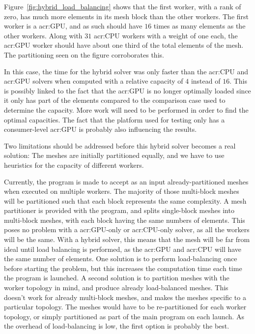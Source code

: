 Figure~\ref{fig:hybrid_load_balancing} shows that the first worker, with a rank of zero, has much
more elements in its mesh block than the other workers. The first worker is a \acrshort{acr:GPU},
and as such should have \(16\) times as many elements as the other workers. Along with \(31\)
\acrshort{acr:CPU} workers with a weight of one each, the \acrshort{acr:GPU} worker should have
about one third of the total elements of the mesh. The partitioning seen on the figure corroborates
this. 

In this case, the time for the hybrid solver was only faster than the \acrshort{acr:CPU} and
\acrshort{acr:GPU} solvers when computed with a relative capacity of \(4\) instead of \(16\). This
is possibly linked to the fact that the \acrshort{acr:GPU} is no longer optimally loaded since it
only has part of the elements compared to the comparison case used to determine the capacity. More
work will need to be performed in order to find the optimal capacities. The fact that the platform
used for testing only has a consumer-level \acrshort{acr:GPU} is probably also influencing the
results. 

Two limitations should be addressed before this hybrid solver becomes a real solution: The meshes
are initially partitioned equally, and we have to use heuristics for the capacity of different
workers. 

Currently, the program is made to accept as an input already-partitioned meshes when executed on
multiple workers. The majority of those multi-block meshes will be partitioned such that each block
represents the same complexity. A mesh partitioner is provided with the program, and splits
single-block meshes into multi-block meshes, with each block having the same numbers of elements.
This poses no problem with a \acrshort{acr:GPU}-only or \acrshort{acr:CPU}-only solver, as all the
workers will be the same. With a hybrid solver, this means that the mesh will be far from ideal
until load balancing is performed, as the \acrshort{acr:GPU} and \acrshort{acr:CPU} will have the
same number of elements. One solution is to perform load-balancing once before starting the problem,
but this increases the computation time each time the program is launched. A second solution is to
partition meshes with the worker topology in mind, and produce already load-balanced meshes. This
doesn't work for already multi-block meshes, and makes the meshes specific to a particular topology.
The meshes would have to be re-partitioned for each worker topology, or simply partitioned as part
of the main program on each launch. As the overhead of load-balancing is low, the first option is
probably the best.

